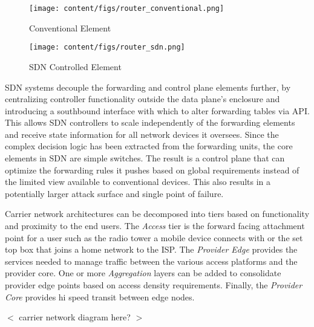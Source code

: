 \begin{figure}[ht]
\centering
\texttt{[image: content/figs/router\_conventional.png]}
\caption{Conventional Element}
\label{fig:router_conventional}
\end{figure} 

\begin{figure}[ht]
\centering
\texttt{[image: content/figs/router\_sdn.png]}
\caption{SDN Controlled Element}
\label{fig:router_sdn}
\end{figure}

SDN systems decouple the forwarding and control plane elements further, by centralizing controller functionality outside the data plane's enclosure and introducing a southbound interface with which to alter forwarding tables via API. This allows SDN controllers to scale independently of the forwarding elements and receive state information for all network devices it oversees. Since the complex decision logic has been extracted from the forwarding units, the core elements in SDN are simple switches. The result is a control plane that can optimize the forwarding rules it pushes based on global requirements instead of the limited view available to conventional devices. This also results in a potentially larger attack surface and single point of failure. 

Carrier network architectures can be decomposed into tiers based on functionality and proximity to the end users. The \textit{Access} tier is the forward facing attachment point for a user such as the radio tower a mobile device connects with or the set top box that joins a home network to the ISP. The \textit{Provider Edge } provides the services needed to manage traffic between the various access platforms and the provider core. One or more \textit{Aggregation} layers can be added to consolidate provider edge points based on access density requirements. Finally, the \textit{Provider Core} provides hi speed transit between edge nodes. 

$<$ carrier network diagram here? $>$

% 

% 
% 



